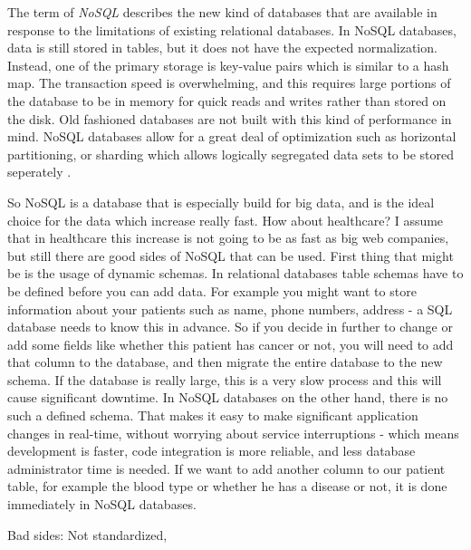 \documentclass{article}
\begin{document}
The term of \emph{NoSQL} describes the new kind of databases that are available in response to the limitations of existing relational databases. In NoSQL databases, data is still stored in tables, but it does not have the expected normalization. Instead, one of the primary storage is key-value pairs which is similar to a hash map.  The transaction speed is overwhelming, and this requires large portions of the database to be in memory for quick reads and writes rather than stored on the disk. Old fashioned databases are not built with this kind of performance in mind. NoSQL databases allow for a great deal of optimization such as horizontal partitioning, or sharding which allows logically segregated data sets to be stored seperately \cite{clouddb9}. 


So NoSQL is a database that is especially build for big data, and is the ideal choice for the data which increase really fast. How about healthcare? I assume that in healthcare this increase is not going to be as fast as big web companies, but still there are good sides of NoSQL that can be used. First thing that might be is the usage of dynamic schemas. In relational databases table schemas have to be defined before you can add data. For example you might want to store information about your patients such as name, phone numbers, address - a SQL database needs to know this in advance. So if you decide in further to change or add some fields like whether this patient has cancer or not, you will need to add that column to the database, and then migrate the entire database to the new schema. If the database is really large, this is a very slow process and this will cause significant downtime. In NoSQL databases on the other hand, there is no such a defined schema. That makes it easy to make significant application changes in real-time, without worrying about service interruptions - which means development is faster, code integration is more reliable, and less database administrator time is needed. If we want to add another column to our patient table, for example the blood type or whether he has a disease or not, it is done immediately in NoSQL databases.


Bad sides: Not standardized,
\end{document}
